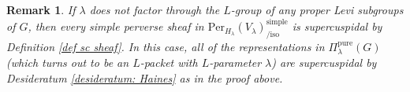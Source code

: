 \documentclass[11pt,letterpaper]{amsart}
\newcommand{\SL}{\mathrm{SL}}
\newcommand{\dualgroup}[1]{{#1}^\vee}
\newcommand{\pure}{\mathrm{pure}}
\newcommand{\Ind}{\mathrm{Ind}}
\newcommand{\LLC}{\mathrm{LLC}}
\newcommand{\Per}{\mathrm{Per}}
\newcommand{\CC}{\mathbb{C}}
\newtheorem{remark}[thm]{Remark}
\newtheorem{desideratum}[thm]{Desideratum}
\renewcommand{\1}{\mathbbm{1}}
\numberwithin{equation}{section}
\begin{document}
{\begin{remark} If $\lambda$ does not factor through the $L$-group of any proper Levi subgroups of $G$, then every simple perverse sheaf in $\Per_{H_\lambda}(V_{\lambda})^{\mathrm{simple}}_{\mathrm{/iso}}$ is supercuspidal by Definition \ref{def sc sheaf}. In this case, all of the representations in $\Pi_{\lambda}^{\pure}(G)$ (which turns out to be an $L$-packet with $L$-parameter $\lambda$) are supercuspidal by Desideratum \ref{desideratum: Haines} as in the proof above.   
\end{remark}








}
\end{document}
